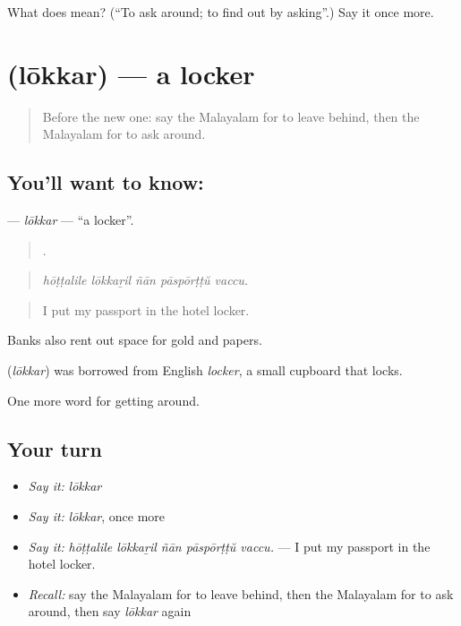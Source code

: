 \begin{tcolorbox}[breakable,colback=teal!4,colframe=teal!35!black,title={Before you move on}]
What does  mean? (\textquotedblleft{}To ask around; to find out by asking\textquotedblright{}.) Say it once more.
\end{tcolorbox}
\section[\texorpdfstring{\ml{ലോക്കർ} (lōkkar)}{ലോക്കർ (lōkkar)}]{ (lōkkar) — a locker}

\label{lesson:ML-C480-lokkar}



\begin{quote}
Before the new one: say the Malayalam for to leave behind, then the Malayalam for to ask around.
\end{quote}

\subsection*{You'll want to know: }
\textbf{} — \emph{lōkkar} — \textquotedblleft{}a locker\textquotedblright{}.

\begin{quote}
    .
\end{quote}

\begin{quote}
\emph{hōṭṭalile lōkkaṟil ñān pāspōrṭṭŭ vaccu.}
\end{quote}

\begin{quote}
I put my passport in the hotel locker.
\end{quote}

Banks also rent out  space for gold and papers.

\begin{cousinweb}
\textbf{} (\emph{lōkkar}) was borrowed from English \emph{locker}, a small cupboard that locks.
\end{cousinweb}

\begin{grammarlens}[title={What you've built}]
One more word for getting around.
\end{grammarlens}

\subsection*{Your turn}
\begin{itemize}
\raggedright
  \item \emph{Say it:} \emph{lōkkar}
  \item \emph{Say it:} \emph{lōkkar}, once more
  \item \emph{Say it:} \emph{hōṭṭalile lōkkaṟil ñān pāspōrṭṭŭ vaccu.} — I put my passport in the hotel locker.
  \item \emph{Recall:} say the Malayalam for to leave behind, then the Malayalam for to ask around, then say \emph{lōkkar} again
\end{itemize}

